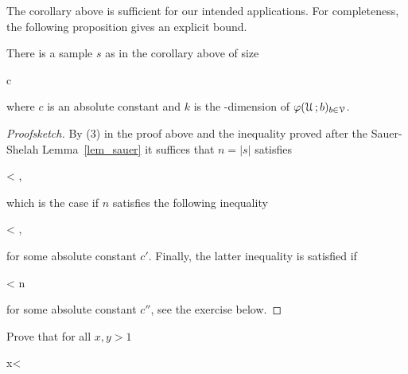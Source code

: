 \documentclass[scombinatorics.tex]{subfiles}
\begin{document}
The corollary above is sufficient for our intended applications.
For completeness, the following proposition gives an explicit bound.

\begin{proposition}\label{prop_vc_sample}
  There is a sample $s$ as in the corollary above of size
  
  {\le}
  {c\,\log{}}
  
  where $c$ is an absolute constant and $k$ is the \vc-dimension of $\varphi(\EuScript U\,;b)_{b\in\EuScript V}$.
\end{proposition}

\begin{proof}[Proofsketch]
  By (3) in the proof above and the inequality proved after the Sauer-Shelah Lemma~\ref{lem_sauer} it suffices that $n=|s|$ satisfies
  
  {<}
  {,}
  
  which is the case if $n$ satisfies the following inequality 

  {<}
  {,}

  for some absolute constant $c'$.
  Finally, the latter inequality is satisfied if 

  {<}
  {n}

  for some absolute constant $c''$, see the exercise below.
\end{proof}

\begin{exercise}
  Prove that for all $x,y>1$

  {\IMP}
  {x< }\QED
  
\end{exercise}





\end{document}
